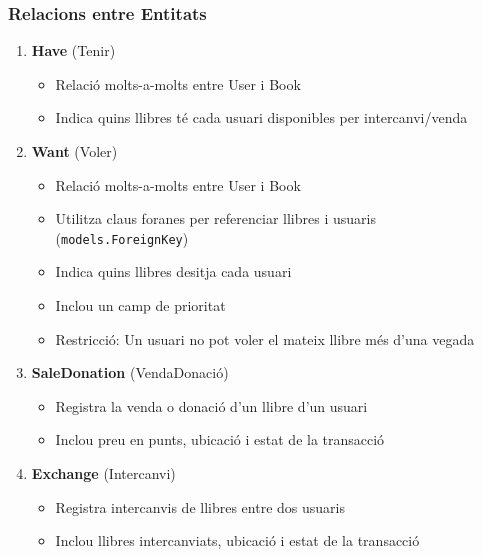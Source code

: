 \hypertarget{relacions-entre-entitats}{%
\subsubsection{Relacions entre
Entitats}\label{relacions-entre-entitats}}

\begin{enumerate}
\def\labelenumi{\arabic{enumi}.}
\tightlist
\item
  \textbf{Have} (Tenir)

  \begin{itemize}
  \tightlist
  \item
    Relació molts-a-molts entre User i Book
  \item
    Indica quins llibres té cada usuari disponibles per intercanvi/venda
  \end{itemize}
\item
  \textbf{Want} (Voler)

  \begin{itemize}
  \tightlist
  \item
    Relació molts-a-molts entre User i Book
  \item
    Utilitza claus foranes per referenciar llibres i usuaris
    (\texttt{models.ForeignKey})
  \item
    Indica quins llibres desitja cada usuari
  \item
    Inclou un camp de prioritat
  \item
    Restricció: Un usuari no pot voler el mateix llibre més d'una vegada
  \end{itemize}
\item
  \textbf{SaleDonation} (VendaDonació)

  \begin{itemize}
  \tightlist
  \item
    Registra la venda o donació d'un llibre d'un usuari
  \item
    Inclou preu en punts, ubicació i estat de la transacció
  \end{itemize}
\item
  \textbf{Exchange} (Intercanvi)

  \begin{itemize}
  \tightlist
  \item
    Registra intercanvis de llibres entre dos usuaris
  \item
    Inclou llibres intercanviats, ubicació i estat de la transacció
  \end{itemize}
\end{enumerate}

